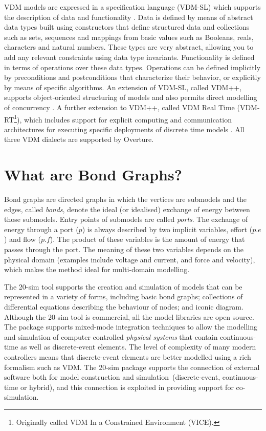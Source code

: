 \documentclass{crescendorepchap}
\begin{document}
VDM models are expressed in a specification language (VDM-SL) which
supports the description of data and functionality
\cite{ISOVDM96a,Fitzgerald&98b,Fitzgerald&09}. Data is defined by
means of abstract data types built using constructors that define structured
data and collections such as sets, sequences and mappings from basic values
such as Booleans, reals, characters and natural numbers. These types are very
abstract, allowing you to add any relevant constraints using data type
invariants. Functionality is defined in terms of operations over these
data types. Operations can be defined implicitly by preconditions and
postconditions that characterize their behavior, or explicitly by
means of specific algorithms. An extension of VDM-SL, called VDM++,
supports object-oriented structuring of models and also permits direct
modelling of concurrency \cite{Fitzgerald&05}. A further extension
to VDM++, called VDM Real Time (VDM-RT\footnote{Originally called VDM In a
Constrained Environment (VICE).}), which includes support for explicit computing
and communication architectures for executing specific deployments of discrete
time models \cite{Mukherjee&00,Verhoef&06b}. All three VDM dialects
are supported by Overture.

\section{What are Bond Graphs?}\label{sec:bond}

Bond graphs are directed graphs in which the vertices are submodels
and the edges, called \textit{bonds}, denote the ideal (or idealised)
exchange of energy between those submodels. Entry points of submodels
are called \textit{ports}. The exchange of energy through a port ($p$) is
always described by two implicit variables, effort ($p.e$) and flow
($p.f$). The product of these variables is the amount of energy that
passes through the port. The meaning of these two variables depends on
the physical domain (examples include voltage and current, and force
and velocity), which makes the method ideal for multi-domain modelling.

The 20-sim tool supports the creation and simulation of models that
can be represented in a variety of forms, including basic bond graphs;
collections of differential equations describing the behaviour of
nodes; and iconic diagram. Although the 20-sim tool is commercial, all the
model libraries are open source. The package supports mixed-mode
integration techniques to allow the modelling and simulation of
computer controlled \textit{physical systems} that contain
continuous-time as well as discrete-event elements. The level of
complexity of many modern controllers means that discrete-event
elements are better modelled using a rich formalism such as VDM. The
20-sim package supports the connection of external software both for
model construction and simulation~(discrete-event, continuous-time or
hybrid), and this connection is exploited in providing support for
co-simulation.
\end{document}
